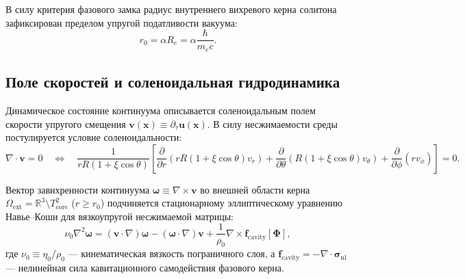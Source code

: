\documentclass[12pt,a4paper]{article}
\begin{document}
	В силу критерия фазового замка радиус внутреннего вихревого керна солитона зафиксирован пределом упругой податливости вакуума:
	\begin{equation}
		r_0 = \alpha R_e = \alpha \frac{\hbar}{m_e c}.
	\end{equation}
	
	\subsection{Поле скоростей и соленоидальная гидродинамика}
	Динамическое состояние континуума описывается соленоидальным полем скорости упругого смещения $\mathbf{v}(\mathbf{x}) \equiv \partial_\tau \mathbf{u}(\mathbf{x})$. В силу несжимаемости среды постулируется условие соленоидальности:
	\begin{equation}
		\nabla \cdot \mathbf{v} = 0 \quad \Longleftrightarrow \quad \frac{1}{r R(1+\xi\cos\theta)} \left[ \frac{\partial}{\partial r}\left( r R (1+\xi\cos\theta) v_r \right) + \frac{\partial}{\partial \theta}\left( R(1+\xi\cos\theta) v_\theta \right) + \frac{\partial}{\partial \phi}\left( r v_\phi \right) \right] = 0.
	\end{equation}
	
	Вектор завихренности континуума $\boldsymbol{\omega} \equiv \nabla \times \mathbf{v}$ во внешней области керна $\Omega_{\text{ext}} = \mathbb{R}^3 \setminus T^2_{\text{core}}$ ($r \ge r_0$) подчиняется стационарному эллиптическому уравнению Навье--Коши для вязкоупругой несжимаемой матрицы:
	\begin{equation}
		\nu_0 \nabla^2 \boldsymbol{\omega} = (\mathbf{v} \cdot \nabla)\boldsymbol{\omega} - (\boldsymbol{\omega} \cdot \nabla)\mathbf{v} + \frac{1}{\rho_0} \nabla \times \mathbf{f}_{\text{cavity}}[\boldsymbol{\Phi}],
		\label{eq:navier_cauchy_vorticity}
	\end{equation}
	где $\nu_0 \equiv \eta_0 / \rho_0$ --- кинематическая вязкость пограничного слоя, а $\mathbf{f}_{\text{cavity}} = -\nabla \cdot \boldsymbol{\sigma}_{\text{nl}}$ --- нелинейная сила кавитационного самодействия фазового керна.
	
\end{document}
